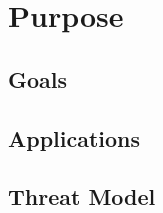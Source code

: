 \chapter{Purpose}
\label{chap:purpose}

\section{Goals}

\section{Applications}

\section{Threat Model}
